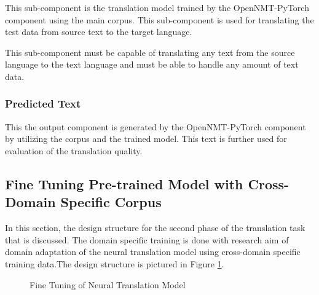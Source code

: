 This sub-component is the translation model trained by the OpenNMT-PyTorch component using the main corpus. This sub-component is used for translating the test data from source text to the target language. 

This sub-component must be capable of translating any text from the source language to the text language and must be able to handle any amount of text data.  

\subsubsection{Predicted Text}

This the output component is generated by the OpenNMT-PyTorch component by utilizing the corpus and the trained model. This text is further used for evaluation of the translation quality.

\subsection{Fine Tuning Pre-trained Model with Cross-Domain 
Specific Corpus}
In this section, the design structure for the second phase of the translation task that is discussed. The domain specific training is done with research aim of domain adaptation of the neural translation model using cross-domain specific training data.The design structure is pictured in Figure \ref{seq2seq2}.

\begin{figure}[h]
\caption{Fine Tuning of Neural Translation Model} \label{seq2seq2}
\end{figure}


